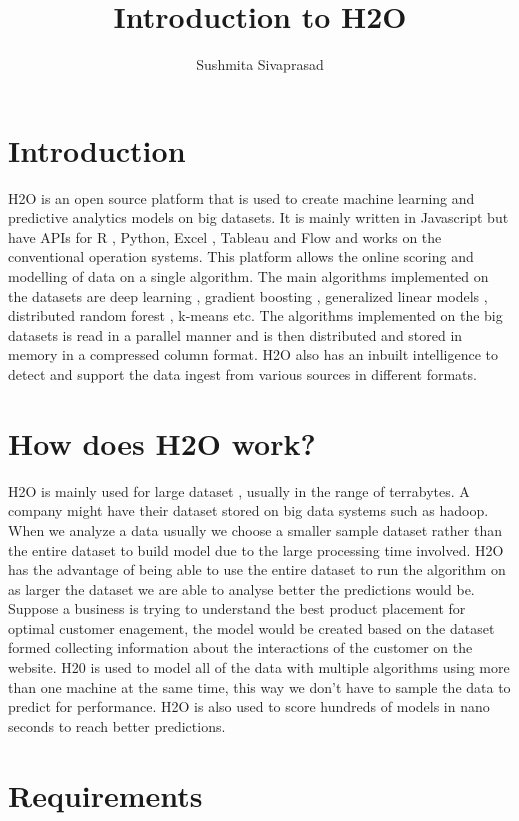 \documentclass[9pt,twocolumn,twoside]{styles/osajnl}
\title{Introduction to H2O}
\author[1]{Sushmita Sivaprasad}
\affil[1]{School of Informatics and Computing, Bloomington, IN 47408, U.S.A.}
\affil[*]{ sushsiva@umail.iu.edu}
\begin{document}
\maketitle

\section{Introduction}

\cite{H2Odocumentation}H2O is an open source platform that is used
to create machine learning and predictive analytics models on big
datasets. It is mainly written in Javascript but have APIs for R ,
Python, Excel , Tableau and Flow and works on the conventional
operation systems. This platform allows the online scoring and
modelling of data on a single algorithm. The main algorithms
implemented on the datasets are deep learning , gradient boosting ,
generalized linear models , distributed random forest , k-means
etc. \cite{H2Odocumentation}The algorithms implemented on the big
datasets is read in a parallel manner and is then distributed and
stored in memory in a compressed column format. H2O also has an
inbuilt intelligence to detect and support the data ingest from
various sources in different formats.\

\section{How does H2O work?}

\cite{www-h2oyoutubevideo}H2O is mainly used for large dataset ,
usually in the range of terrabytes. A company might have their dataset
stored on big data systems such as hadoop. When we analyze a data
usually we choose a smaller sample dataset rather than the entire
dataset to build model due to the large processing time involved. H2O
has the advantage of being able to use the entire dataset to run the
algorithm on as larger the dataset we are able to analyse better the
predictions would be.  Suppose a business is trying to understand the
best product placement for optimal customer enagement, the model would
be created based on the dataset formed collecting information about
the interactions of the customer on the website. H20 is used to model
all of the data with multiple algorithms using more than one machine
at the same time, this way we don’t have to sample the data to predict
for performance. H2O is also used to score hundreds of models in nano
seconds to reach better predictions.

\section{Requirements}
\cite{www-h2o-requirements}
\end{document}

